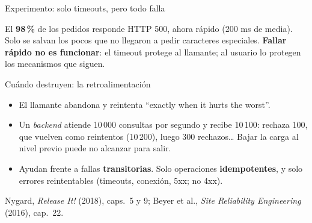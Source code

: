 \documentclass[institutional,screen,none]{ua-engineering-v6-beamer}
\begin{document}
\begin{frame}{Experimento: solo timeouts, pero todo falla}

{\footnotesize El \textbf{98\,\%} de los pedidos responde HTTP 500, ahora rápido (200 ms de media). Solo se salvan los pocos que no llegaron a pedir caracteres especiales. \textbf{Fallar rápido no es funcionar}: el timeout protege al llamante; al usuario lo protegen los mecanismos que siguen.}
\end{frame}


\begin{frame}{Cuándo destruyen: la retroalimentación}
\begin{center}
\end{center}

\begin{itemize}\small
\item El llamante abandona y reintenta ``exactly when it hurts the worst''.
\item Un \emph{backend} atiende 10\,000 consultas por segundo y recibe 10\,100: rechaza 100, que vuelven como reintentos (10\,200), luego 300 rechazos\ldots{} Bajar la carga al nivel previo puede no alcanzar para salir.
\item Ayudan frente a fallas \textbf{transitorias}. Solo operaciones \textbf{idempotentes}, y solo errores reintentables (timeouts, conexión, 5xx; no 4xx).
\end{itemize}

{\scriptsize\color{UAIngMuted}Nygard, \emph{Release It!} (2018), caps.~5 y 9; Beyer et al., \emph{Site Reliability Engineering} (2016), cap.~22.}
\end{frame}
\end{document}
